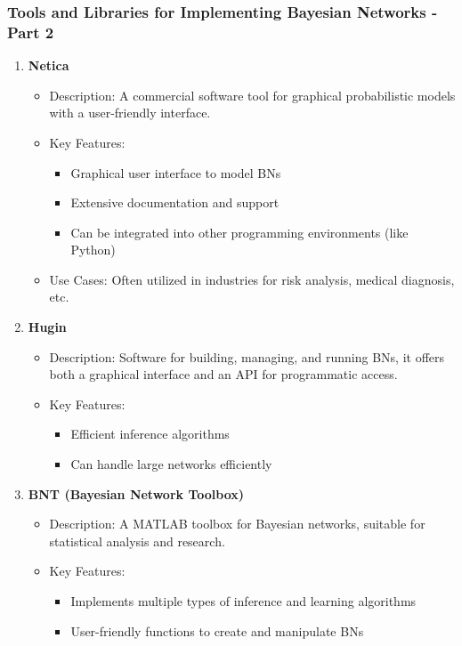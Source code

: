 \documentclass[aspectratio=169]{beamer}
\begin{document}
\begin{frame}[fragile]
    \frametitle{Tools and Libraries for Implementing Bayesian Networks - Part 2}
    \begin{enumerate}[resume]
        \item \textbf{Netica}
        \begin{itemize}
            \item Description: A commercial software tool for graphical probabilistic models with a user-friendly interface.
            \item Key Features:
            \begin{itemize}
                \item Graphical user interface to model BNs
                \item Extensive documentation and support
                \item Can be integrated into other programming environments (like Python)
            \end{itemize}
            \item Use Cases: Often utilized in industries for risk analysis, medical diagnosis, etc.
        \end{itemize}

        \item \textbf{Hugin}
        \begin{itemize}
            \item Description: Software for building, managing, and running BNs, it offers both a graphical interface and an API for programmatic access.
            \item Key Features:
            \begin{itemize}
                \item Efficient inference algorithms
                \item Can handle large networks efficiently
            \end{itemize}
        \end{itemize}

        \item \textbf{BNT (Bayesian Network Toolbox)}
        \begin{itemize}
            \item Description: A MATLAB toolbox for Bayesian networks, suitable for statistical analysis and research.
            \item Key Features:
            \begin{itemize}
                \item Implements multiple types of inference and learning algorithms
                \item User-friendly functions to create and manipulate BNs
            \end{itemize}
        \end{itemize}
    \end{enumerate}
\end{frame}
\end{document}
